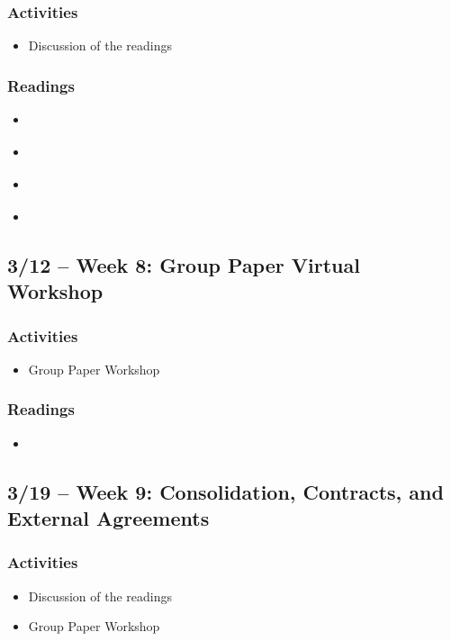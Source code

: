 \documentclass[12pt, letterpaper]{article}
\begin{document}
    \subsubsection*{Activities}
        \begin{itemize}
            \item Discussion of the readings
        \end{itemize}
    \subsubsection*{Readings}
        \begin{itemize}
            \item \citet[chapter 7]{Agranoff2012}
            \item \citet[chapter 9]{Agranoff2023}
            \item \citet[chapter 8]{Henderson2015}
            \item \citet[chapters 3--4]{OLeary2009}
        \end{itemize}
 
\subsection*{3/12 -- Week 8: Group Paper Virtual Workshop}

    \subsubsection*{Activities}
        \begin{itemize}
            \item Group Paper Workshop
        \end{itemize}
    \subsubsection*{Readings}
        \begin{itemize}
            \item \citet{OSTROM2010a}
        \end{itemize}

\subsection*{3/19 -- Week 9: Consolidation, Contracts, and External Agreements}
    \subsubsection*{Activities}
        \begin{itemize}
            \item Discussion of the readings
            \item Group Paper Workshop
        \end{itemize}
\end{document}
